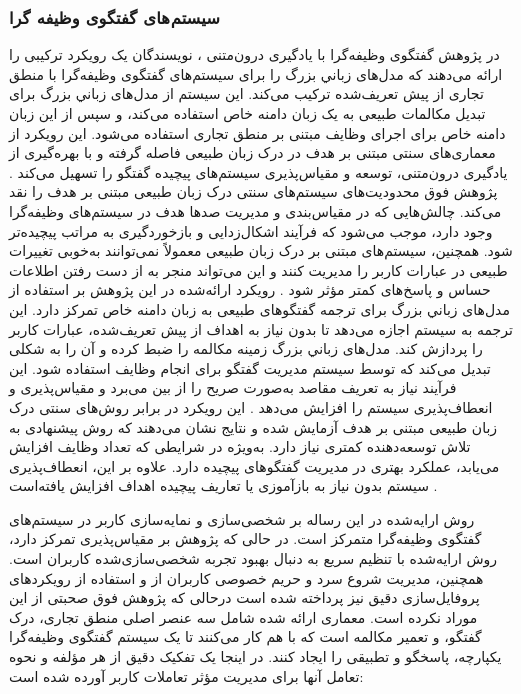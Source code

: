 \subsubsection{سیستم های گفتگوی وظیفه گرا}
در پژوهش گفتگوی وظیفه‌گرا با یادگیری درون‌متنی%
\cite{bocklisch2024task}
، نویسندگان یک رویکرد ترکیبی را ارائه می‌دهند که مدل‌های زباني بزرگ را برای سیستم‌های گفتگوی وظیفه‌گرا با 
منطق تجاری%
 از پیش‌ تعریف‌شده ترکیب می‌کند. این سیستم از مدل‌های زباني بزرگ برای تبدیل مکالمات طبیعی به یک  
زبان دامنه خاص%
 استفاده می‌کند، و سپس از این زبان دامنه خاص برای اجرای وظایف مبتنی بر منطق تجاری استفاده می‌شود. این رویکرد از معماری‌های سنتی مبتنی بر هدف در درک زبان طبیعی فاصله گرفته و با بهره‌گیری از یادگیری درون‌متنی، توسعه و مقیاس‌پذیری سیستم‌های پیچیده گفتگو را تسهیل می‌کند .
\newline
پژوهش فوق محدودیت‌های سیستم‌های سنتی درک زبان طبیعی مبتنی بر هدف را نقد می‌کند. چالش‌هایی که در مقیاس‌بندی و مدیریت صدها هدف در سیستم‌های وظیفه‌گرا وجود دارد، موجب می‌شود که فرآیند اشکال‌زدایی و بازخوردگیری به مراتب پیچیده‌تر شود. همچنین، سیستم‌های مبتنی بر درک زبان طبیعی معمولاً نمی‌توانند به‌خوبی تغییرات طبیعی در عبارات کاربر را مدیریت کنند و این می‌تواند منجر به از دست رفتن اطلاعات حساس و پاسخ‌های کمتر مؤثر شود .
\newline
رویکرد ارائه‌شده در این پژوهش بر استفاده از مدل‌های زباني بزرگ برای ترجمه گفتگوهای طبیعی به زبان دامنه خاص تمرکز دارد. این ترجمه به سیستم اجازه می‌دهد تا بدون نیاز به اهداف از پیش‌ تعریف‌شده، عبارات کاربر را پردازش کند. مدل‌های زباني بزرگ زمینه مکالمه را ضبط کرده و آن را به شکلی تبدیل می‌کند که توسط سیستم مدیریت گفتگو برای انجام وظایف استفاده شود. این فرآیند نیاز به تعریف مقاصد به‌صورت صریح را از بین می‌برد و مقیاس‌پذیری و انعطاف‌پذیری سیستم را افزایش می‌دهد .
\newline
این رویکرد در برابر روش‌های سنتی درک زبان طبیعی مبتنی بر هدف آزمایش شده و نتایج نشان می‌دهند که روش پیشنهادی به تلاش توسعه‌دهنده کمتری نیاز دارد. به‌ویژه در شرایطی که تعداد وظایف افزایش می‌یابد، عملکرد بهتری در مدیریت گفتگوهای پیچیده دارد. علاوه بر این، انعطاف‌پذیری سیستم بدون نیاز به بازآموزی یا تعاریف پیچیده اهداف افزایش یافته‌است .

روش ارایه‌شده در این رساله بر شخصی‌سازی و نمایه‌سازی کاربر در سیستم‌های گفتگوی وظیفه‌گرا متمرکز است. در حالی که پژوهش%
\cite{bocklisch2024task}
 بر مقیاس‌پذیری تمرکز دارد، روش ارايه‌شده با تنظیم سریع به دنبال بهبود تجربه شخصی‌سازی‌شده کاربران است. همچنین، مدیریت شروع سرد و حریم خصوصی کاربران از و استفاده از رویکردهای پروفایل‌سازی دقیق نیز پرداخته شده است درحالی که پژوهش فوق صحبتی از این موراد نکرده است.
\newline
معماری ارائه شده شامل سه عنصر اصلی منطق تجاری، درک گفتگو، و تعمیر مکالمه است که با هم کار می‌کنند تا یک سیستم گفتگوی وظیفه‌گرا یکپارچه، پاسخگو و تطبیقی ​​را ایجاد کنند. در اینجا یک تفکیک دقیق از هر مؤلفه و نحوه تعامل آنها برای مدیریت مؤثر تعاملات کاربر آورده شده است:

